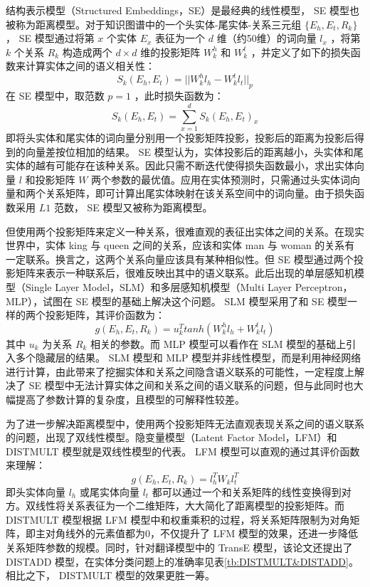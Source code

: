 \documentclass{llncs}
\begin{document}
结构表示模型（Structured Embeddings，SE）\cite{DBLP:conf/aaai/BordesWCB11}是最经典的线性模型， SE 模型也被称为距离模型。对于知识图谱中的一个头实体-尾实体-关系三元组 $\{E_h, E_t, R_k\}$ ， SE 模型通过将第 $x$ 个实体 $E_x$ 表征为一个 $d$ 维（约50维）的词向量 $l_x$ ，将第 $k$ 个关系 $R_k$ 构造成两个 $d×d$ 维的投影矩阵 $W^h_k$ 和 $W^t_k$ ，并定义了如下的损失函数来计算实体之间的语义相关性：
\begin{displaymath}
S_k(E_h,E_t)=||W^h_kl_h-W^t_kl_t||_p
\end{displaymath}
在 SE 模型中，取范数 $p=1$ ，此时损失函数为：
\begin{displaymath}
S_k(E_h,E_t)=\sum_{x=1}^d{S_k(E_h,E_t)_x}
\end{displaymath}
即将头实体和尾实体的词向量分别用一个投影矩阵投影，投影后的距离为投影后得到的向量差按位相加的结果。 SE 模型认为，实体投影后的距离越小，头实体和尾实体的越有可能存在该种关系。因此只需不断迭代使得损失函数最小，求出实体向量 $l$ 和投影矩阵 $W$ 两个参数的最优值。应用在实体预测时，只需通过头实体词向量和两个关系矩阵，即可计算出尾实体映射在该关系空间中的词向量。由于损失函数采用 $L1$ 范数， SE 模型又被称为距离模型。

但使用两个投影矩阵来定义一种关系，很难直观的表征出实体之间的关系。在现实世界中，实体 king 与 queen 之间的关系，应该和实体 man 与 woman 的关系有一定联系。换言之，这两个关系向量应该具有某种相似性。但 SE 模型通过两个投影矩阵来表示一种联系后，很难反映出其中的语义联系。此后出现的单层感知机模型（Single Layer Model，SLM）\cite{DBLP:conf/nips/SocherCMN13}和多层感知机模型（Multi Layer Perceptron，MLP）\cite{DBLP:conf/kdd/0001GHHLMSSZ14}，试图在 SE 模型的基础上解决这个问题。 SLM 模型采用了和 SE 模型一样的两个投影矩阵，其评价函数为：
\begin{displaymath}
g(E_h,E_t,R_k)=u_k^Ttanh(W^h_kl_h+W^t_kl_t)
\end{displaymath}
其中 $u_k$ 为关系 $R_k$ 相关的参数。而 MLP 模型可以看作在 SLM 模型的基础上引入多个隐藏层的结果。 SLM 模型和 MLP 模型并非线性模型，而是利用神经网络进行计算，由此带来了挖掘实体和关系之间隐含语义联系的可能性，一定程度上解决了 SE 模型中无法计算实体之间和关系之间的语义联系的问题，但与此同时也大幅提高了参数计算的复杂度，且模型的可解释性较差。

为了进一步解决距离模型中，使用两个投影矩阵无法直观表现关系之间的语义联系的问题，出现了双线性模型。隐变量模型（Latent Factor Model，LFM）\cite{DBLP:conf/nips/JenattonRBO12}和 DISTMULT 模型\cite{DBLP:journals/corr/YangYHGD14a}就是双线性模型的代表。 LFM 模型可以直观的通过其评价函数来理解：
\begin{displaymath}
g(E_h,E_t,R_k)=l_h^TW_kl_t^T
\end{displaymath}
即头实体向量 $l_h$ 或尾实体向量 $l_t$ 都可以通过一个和关系矩阵的线性变换得到对方。双线性将关系表征为一个二维矩阵，大大简化了距离模型的投影矩阵。而 DISTMULT 模型根据 LFM 模型中和权重乘积的过程，将关系矩阵限制为对角矩阵，即主对角线外的元素值都为0，不仅提升了 LFM 模型的效果，还进一步降低关系矩阵参数的规模。同时，针对翻译模型中的 TransE 模型\cite{DBLP:conf/ccir/CaiLZM18}，该论文还提出了 DISTADD 模型\cite{DBLP:journals/corr/YangYHGD14a}，在实体分类问题上的准确率见表\ref{tb:DISTMULT&DISTADD}。相比之下， DISTMULT 模型的效果更胜一筹。
\end{document}
